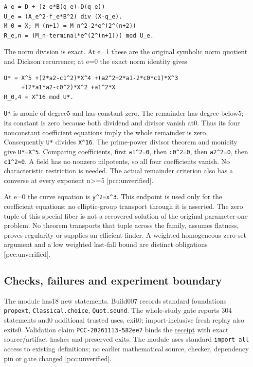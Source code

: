 \documentclass[
  10pt,
]{article}
\begin{document}
\begin{verbatim}
A_e = D + (z_e*B(q_e)-D(q_e))
U_e = (A_e^2-f_e*B^2) div (X-q_e).
M_0 = X; M_(n+1) = M_n^2-2*e^(2^(n+2))
R_e,n = (M_n-terminal*e^(2^(n+1))) mod U_e.
\end{verbatim}

The norm division is exact. At e=1 these are the original symbolic norm
quotient and Dickson recurrence; at e=0 the exact norm identity gives

\begin{verbatim}
U* = X^5 +(2*a2-c1^2)*X^4 +(a2^2+2*a1-2*c0*c1)*X^3
     +(2*a1*a2-c0^2)*X^2 +a1^2*X
R_0,4 = X^16 mod U*.
\end{verbatim}

\texttt{U*} is monic of degree5 and has constant zero. The remainder has
degree below5; its constant is zero because both dividend and divisor
vanish at0. Thus its four nonconstant coefficient equations imply the
whole remainder is zero. Consequently \texttt{U*} divides
\texttt{X\^{}16}. The prime-power divisor theorem and monicity give
\texttt{U*=X\^{}5}. Comparing coefficients, first \texttt{a1\^{}2=0},
then \texttt{c0\^{}2=0}, then \texttt{a2\^{}2=0}, then
\texttt{c1\^{}2=0}. A field has no nonzero nilpotents, so all four
coefficients vanish. No characteristic restriction is needed. The actual
remainder criterion also has a converse at every exponent
n\textgreater=5 {[}pcc:unverified{]}.

At e=0 the curve equation is \texttt{y\^{}2=x\^{}3}. This endpoint is
used only for the coefficient equations; no elliptic-group transport
through it is asserted. The zero tuple of this special fiber is not a
recovered solution of the original parameter-one problem. No theorem
transports that tuple across the family, assumes flatness, proves
regularity or supplies an efficient finder. A weighted homogeneous
zero-set argument and a low weighted last-fall bound are distinct
obligations {[}pcc:unverified{]}.

\subsection{Checks, failures and experiment
boundary}\label{checks-failures-and-experiment-boundary}

The module has18 new statements. Build007 records standard foundations
\texttt{propext}, \texttt{Classical.choice}, \texttt{Quot.sound}. The
whole-study gate reports 304 statements and0 additional trusted uses,
exit0; import-inclusive fresh replay also exits0. Validation claim
\texttt{PCC-20261113-582ee7} binds the
\href{../weighted-leading-evidence/validation-001.json}{receipt} with
exact source/artifact hashes and preserved exits. The module uses
standard \texttt{import\ all} access to existing definitions; no earlier
mathematical source, checker, dependency pin or gate changed
{[}pcc:unverified{]}.
\end{document}
